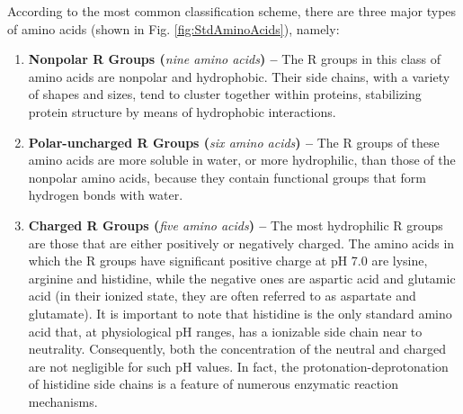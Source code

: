 According to the most common classification scheme, there are three major types of amino acids (shown in Fig. \ref{fig:StdAminoAcids}), namely: %
\begin{enumerate}
\item \textbf{Nonpolar R Groups (}\textit{nine amino acids}\textbf{) --} %
The R groups in this class of amino acids are nonpolar and hydrophobic. Their side chains, with a variety of shapes and sizes, tend to cluster together within proteins, stabilizing protein structure by means of hydrophobic interactions.

\item \textbf{Polar-uncharged R Groups (}\textit{six amino acids}\textbf{) --} %
The R groups of these amino acids are more soluble in water, or more hydrophilic, than those of the nonpolar amino acids, because they contain functional groups that form hydrogen bonds with water.%

\item \textbf{Charged R Groups (}\textit{five amino acids}\textbf{) --} %
The most hydrophilic R groups are those that are either positively or negatively charged. 
The amino acids in which the R groups have significant positive charge at pH 7.0 are lysine, arginine and histidine, while the negative ones are aspartic acid and glutamic acid (in their ionized state, they are often referred to as aspartate and glutamate). It is important to note that histidine is the only standard amino acid that, at physiological pH ranges, has a ionizable side chain near to neutrality. Consequently, both the concentration of the neutral and charged are not negligible for such pH values. In fact, the protonation-deprotonation of histidine side chains is a feature of numerous enzymatic reaction mechanisms.
\end{enumerate}


